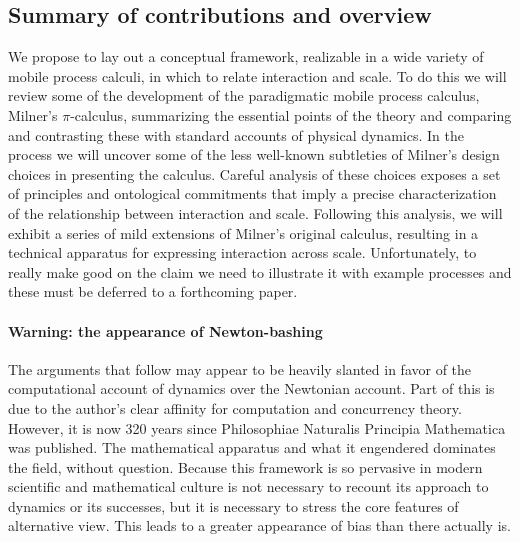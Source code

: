 \subsection{Summary of contributions and overview}

We propose to lay out a conceptual framework, realizable in a wide
variety of mobile process calculi, in which to relate interaction and
scale. To do this we will review some of the development of the
paradigmatic mobile process calculus, Milner's $\pi$-calculus,
summarizing the essential points of the theory and comparing and
contrasting these with standard accounts of physical dynamics. In the
process we will uncover some of the less well-known subtleties of
Milner's design choices in presenting the calculus. Careful analysis
of these choices exposes a set of principles and ontological
commitments that imply a precise characterization of the relationship
between interaction and scale. Following this analysis, we will
exhibit a series of mild extensions of Milner's original calculus,
resulting in a technical apparatus for expressing interaction across
scale. Unfortunately, to really make good on the claim we need to
illustrate it with example processes and these must be deferred to a
forthcoming paper.

\paragraph{Warning: the appearance of Newton-bashing}
The arguments that follow may appear to be heavily slanted in favor of
the computational account of dynamics over the Newtonian account. Part
of this is due to the author's clear affinity for computation and
concurrency theory. However, it is now 320 years since Philosophiae
Naturalis Principia Mathematica was published. The mathematical
apparatus and what it engendered dominates the field, without
question. Because this framework is so pervasive in modern scientific
and mathematical culture is not necessary to recount its approach to
dynamics or its successes, but it is necessary to stress the core
features of alternative view. This leads to a greater appearance of
bias than there actually is. 

